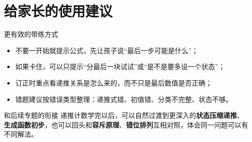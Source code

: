 \documentclass[11pt,a4paper,fontset=fandol]{ctexart}
\begin{document}
\section{给家长的使用建议}

\begin{warnbox}{更有效的带练方式}
\begin{itemize}
  \item 不要一开始就提示公式，先让孩子说“最后一步可能是什么”；
  \item 如果卡住，可以只提示“分最后一块试试”或“是不是要多设一个状态”；
  \item 订正时重点看递推关系是怎么来的，而不只是最后数值是否正确；
  \item 错题建议按错误类型整理：递推式错、初值错、分类不完整、状态不够。
\end{itemize}
\end{warnbox}

\begin{infobox}{和后续专题的衔接}
递推计数学完以后，可以自然过渡到更深入的\textbf{状态压缩递推}、\textbf{生成函数初步}，也可以回头和\textbf{容斥原理}、\textbf{错位排列}互相对照，体会同一问题可以有不同解法。
\end{infobox}
\end{document}
